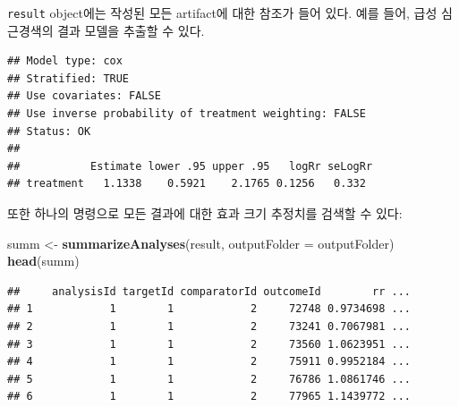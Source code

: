 \documentclass[11pt]{book}
\newenvironment{Shaded}{\begin{snugshade}}{\end{snugshade}}
\newcommand{\KeywordTok}[1]{\textcolor[rgb]{0.13,0.29,0.53}{\textbf{#1}}}
\newcommand{\DataTypeTok}[1]{\textcolor[rgb]{0.13,0.29,0.53}{#1}}
\newcommand{\DecValTok}[1]{\textcolor[rgb]{0.00,0.00,0.81}{#1}}
\newcommand{\StringTok}[1]{\textcolor[rgb]{0.31,0.60,0.02}{#1}}
\newcommand{\OperatorTok}[1]{\textcolor[rgb]{0.81,0.36,0.00}{\textbf{#1}}}
\newcommand{\NormalTok}[1]{#1}
\theoremstyle{definition}
\theoremstyle{definition}
\theoremstyle{definition}
\theoremstyle{remark}
\begin{document}
\texttt{result} object에는 작성된 모든 artifact에 대한 참조가 들어 있다.
예를 들어, 급성 심근경색의 결과 모델을 추출할 수 있다.

\begin{Shaded}
\end{Shaded}

\begin{verbatim}
## Model type: cox
## Stratified: TRUE
## Use covariates: FALSE
## Use inverse probability of treatment weighting: FALSE
## Status: OK
## 
##           Estimate lower .95 upper .95   logRr seLogRr
## treatment   1.1338    0.5921    2.1765 0.1256   0.332
\end{verbatim}

또한 하나의 명령으로 모든 결과에 대한 효과 크기 추정치를 검색할 수 있다:

\begin{Shaded}
\begin{Highlighting}[]
\NormalTok{summ <-}\StringTok{ }\KeywordTok{summarizeAnalyses}\NormalTok{(result, }\DataTypeTok{outputFolder =}\NormalTok{ outputFolder)}
\KeywordTok{head}\NormalTok{(summ)}
\end{Highlighting}
\end{Shaded}

\begin{verbatim}
##     analysisId targetId comparatorId outcomeId        rr ...
## 1            1        1            2     72748 0.9734698 ...
## 2            1        1            2     73241 0.7067981 ...
## 3            1        1            2     73560 1.0623951 ...
## 4            1        1            2     75911 0.9952184 ...
## 5            1        1            2     76786 1.0861746 ...
## 6            1        1            2     77965 1.1439772 ...
\end{verbatim}
\end{document}
